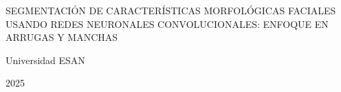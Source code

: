 \begin{center}
	{SEGMENTACIÓN DE CARACTERÍSTICAS MORFOLÓGICAS FACIALES USANDO REDES NEURONALES CONVOLUCIONALES: ENFOQUE EN ARRUGAS Y MANCHAS}
\end{center}

\leftline{-------------}
\vspace{3cm}

\rightline{\fillin[9cm]}
\vspace{3cm}

\rightline{\fillin[9cm]}
\vspace{3cm}


\centerline{Universidad ESAN}
\centerline{2025}